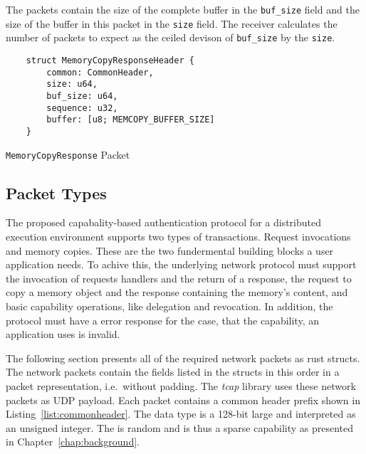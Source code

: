 The packets contain the size of the complete buffer in the \texttt{buf\_size} field and the size of the buffer in this packet in the \texttt{size} field. The receiver calculates the number of packets to expect as the ceiled devison of \texttt{buf\_size} by the \texttt{size}.

\begin{listing}[H]
  \begin{verbatim}
    struct MemoryCopyResponseHeader {
        common: CommonHeader,
        size: u64,
        buf_size: u64,
        sequence: u32,
        buffer: [u8; MEMCOPY_BUFFER_SIZE]
    }
  \end{verbatim}
  \caption{\label{list:memcopyresponse} \texttt{MemoryCopyResponse} Packet}
\end{listing}

\subsection{Packet Types}
The proposed capabality-based authentication protocol for a distributed execution environment supports two types of transactions. Request invocations and memory copies. These are the two fundermental building blocks a user application needs.
To achive this, the underlying network protocol must support the invocation of requests handlers and the return of a response, the request to copy a memory object and the response containing the memory's content, and basic capability operations, like delegation and revocation. In addition, the protocol must have a error response for the case, that the capability, an application uses is invalid.

The following section presents all of the required network packets as rust structs. The network packets contain the fields listed in the structs in this order in a packet representation, i.e.\ without padding. The \emph{tcap} library uses these network packets as \ac{UDP} payload. Each packet contains a common header prefix shown in Listing~\ref{list:commonheader}. The  data type is a 128-bit large and interpreted as an unsigned integer. The  is random and is thus a sparse capability as presented in Chapter~\ref{chap:background}.

